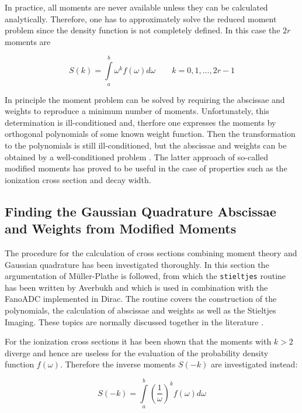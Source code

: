 In practice, all moments are never available unless they can be
calculated analytically. Therefore, one has to approximately solve the reduced
moment problem since the density function is not completely defined.
In this case the $2r$ moments are

\begin{equation}
  S(k) = \int\limits_a^b \omega^k f(\omega) d\omega \quad\quad k=0,1,...,2r-1  
\end{equation}

In principle the moment problem can be solved by requiring the abscissae and
weights to reproduce a minimum number of moments. Unfortunately, this determination
is ill-conditioned and, therfore one expresses the moments by orthogonal
polynomials of some known weight function. Then the
transformation to the polynomials is still ill-conditioned, but the abscissae
and weights can be obtained by a well-conditioned problem \cite{Blumstein73}.
The latter approach
of so-called modified moments has proved to be useful in the case of
properties such as the ionization
cross section and decay width.





\subsection{Finding the Gaussian Quadrature Abscissae and Weights from Modified Moments}

The procedure for the calculation of cross sections combining moment
theory and Gaussian quadrature has been investigated thoroughly. In this section
the argumentation of Müller-Plathe \cite{MuellerPlathe90} is followed, from which the
\verb|stieltjes| routine has been written by Averbukh and which is used in
combination with the FanoADC implemented in Dirac. The routine covers 
the construction of the polynomials, the calculation of abscissae and weights as well
as the Stieltjes Imaging. These topics are normally discussed together in the
literature \cite{MuellerPlathe89,Corcoran77,Langhoff76}.

For the ionization cross sections it has been shown that the moments with
$k>2$ diverge and hence are useless for the evaluation of the probability
density function $f(\omega)$. Therefore the inverse moments $S(-k)$ are investigated
instead:

\begin{equation}
  S(-k) = \int\limits_a^b \left( \frac{1}{\omega} \right) ^k f(\omega) d\omega
\end{equation}

